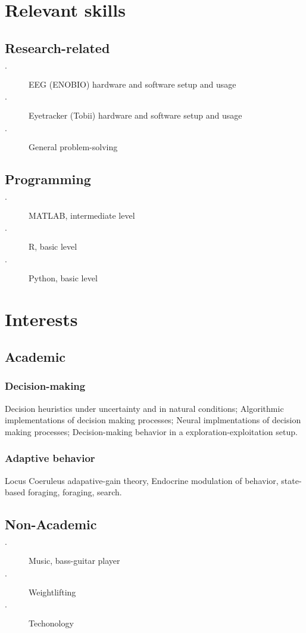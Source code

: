 \documentclass{article}
\begin{document}
\section{Relevant skills}
\subsection{Research-related}
\begin{description}
    \item[$\cdot$] EEG (ENOBIO) hardware and software setup and usage
    \item[$\cdot$] Eyetracker (Tobii) hardware and software setup and usage
    \item[$\cdot$] General problem-solving

\end{description}
\subsection{Programming}
\begin{description}
    \item[$\cdot$] MATLAB, intermediate level
    \item[$\cdot$] R, basic level
    \item[$\cdot$] Python, basic level
\end{description}
\section{Interests}
\subsection{Academic}
\subsubsection{Decision-making} Decision heuristics under uncertainty and in natural conditions; Algorithmic implementations of decision making processes; Neural implmentations of decision making processes; Decision-making behavior in a exploration-exploitation setup.
\subsubsection{Adaptive behavior} Locus Coeruleus adapative-gain theory, Endocrine modulation of behavior, state-based foraging, foraging, search.
\subsection{Non-Academic}
\begin{description}
    \item[$\cdot$] Music, bass-guitar player
    \item[$\cdot$] Weightlifting
    \item[$\cdot$] Techonology
\end{description}
\end{document}
